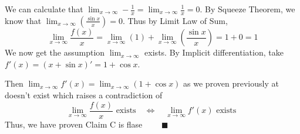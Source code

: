 \documentclass[12pt]{exam}
\newcommand*\circled[1]{\tikz[baseline=(char.base)]{
    \node[shape=circle, draw, inner sep=1pt, 
        minimum height=12pt] (char) {#1};}}
\begin{document}
\begin{enumerate}
\begin{enumerate}
		    We can calculate that $\lim_{x \to \infty}-\frac{1}{x}=\lim_{x \to \infty}\frac{1}{x}=0$. By Squeeze Theorem, we know that $\lim_{x \to \infty}(\frac{\sin{x}}{x})=0$. Thus by     Limit Law of Sum,
		    $$
		        \lim_{x \to \infty} \frac{f(x)}{x}=\lim_{x \to \infty}(1)+\lim_{x \to \infty}(\frac{\sin{x}}{x})=1+0=1
		    $$
		    We now get the assumption $\lim_{x \to \infty}$ exists. By Implicit differentiation, take $f'(x)=(x+\sin{x})'=1+\cos{x}$.
		    
		    Then $\lim_{x \to \infty}f'(x)=\lim_{x \to \infty}(1+\cos{x})$ as we proven previously at \circled{7} doesn't exist which raises a contradiction of
		    $$
		        \lim_{x \to \infty} \frac{f(x)}{x} \mbox{ exists} \quad \iff \quad \lim_{x \to \infty} f'(x) \mbox{ exists }
		    $$
		    Thus, we have proven Claim C is flase $\qquad\blacksquare$
		    
	\end{enumerate}

\end{enumerate}
\end{document}
